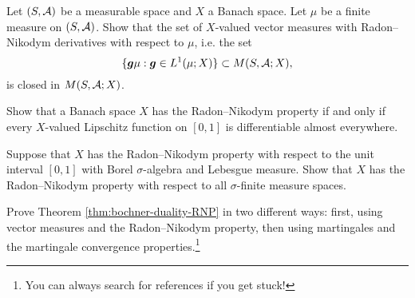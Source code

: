 \begin{exercise}\label{ex:closure-M}
  Let $(S,\mathcal{A})$ be a measurable space and $X$ a Banach space.
  Let $\mu$ be a finite measure on $(S,\mathcal{A})$.
  Show that the set of $X$-valued vector measures with Radon--Nikodym derivatives with respect to $\mu$, i.e. the set
  \begin{equation*}
    \{\bm{g}\mu : \bm{g} \in L^1(\mu;X)\} \subset M(S,\mathcal{A};X),
  \end{equation*}
  is closed in $M(S,\mathcal{A};X)$.
\end{exercise}

\begin{exercise}
  Show that a Banach space $X$ has the Radon--Nikodym property if and only if every $X$-valued Lipschitz function on $[0,1]$ is differentiable almost everywhere.
\end{exercise}

\begin{exercise}\label{ex:RNP-unitinterval}
  Suppose that $X$ has the Radon--Nikodym property with respect to the unit interval $[0,1]$ with Borel $\sigma$-algebra and Lebesgue measure.
  Show that $X$ has the Radon--Nikodym property with respect to all $\sigma$-finite measure spaces.
\end{exercise}

\begin{exercise}\label{ex:RNP-bochner}
  Prove Theorem \ref{thm:bochner-duality-RNP} in two different ways: first, using vector measures and the Radon--Nikodym property, then using martingales and the martingale convergence properties.\footnote{You can always search for references if you get stuck!}
\end{exercise}




